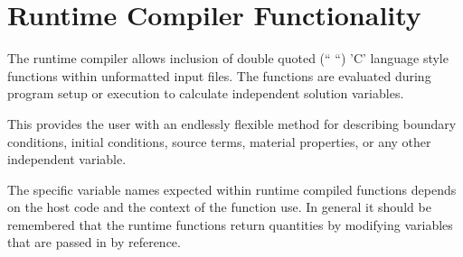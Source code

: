 \section{Runtime Compiler Functionality}
\label{sec:runtime-compiler-functionality}

The runtime compiler allows inclusion of double quoted (`` ``) 'C'
language style
functions within unformatted input files.  The functions are
evaluated during program setup or execution to calculate independent
solution variables. 

This provides the user with an endlessly flexible method for
describing boundary conditions, initial conditions, source terms,
material properties, or any other independent variable.

The specific variable names expected within runtime compiled functions
depends on the host code and the context of the function use. In
general it should be remembered that the runtime functions return
quantities by modifying variables that are passed in by reference.


